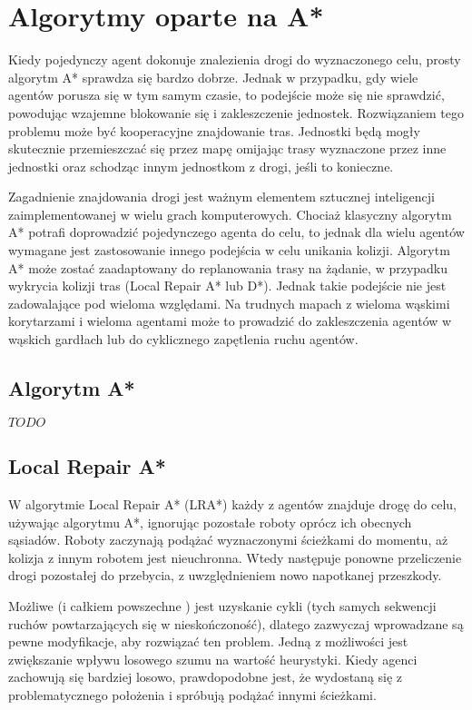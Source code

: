 \chapter{Algorytmy oparte na A*}
\label{ch:astar}

Kiedy pojedynczy agent dokonuje znalezienia drogi do wyznaczonego celu, prosty algorytm A* sprawdza się bardzo dobrze. Jednak w przypadku, gdy wiele agentów porusza się w tym samym czasie, to podejście może się nie sprawdzić, powodując wzajemne blokowanie się i zakleszczenie jednostek. Rozwiązaniem tego problemu może być kooperacyjne znajdowanie tras. Jednostki będą mogły skutecznie przemieszczać się przez mapę omijając trasy wyznaczone przez inne jednostki oraz schodząc innym jednostkom z drogi, jeśli to konieczne. \cite{cooppath}

Zagadnienie znajdowania drogi jest ważnym elementem sztucznej inteligencji zaimplementowanej w wielu grach komputerowych. Chociaż klasyczny algorytm A* potrafi doprowadzić pojedynczego agenta do celu, to jednak dla wielu agentów wymagane jest zastosowanie innego podejścia w celu unikania kolizji. Algorytm A* może zostać zaadaptowany do replanowania trasy na żądanie, w przypadku wykrycia kolizji tras (Local Repair A* lub D*). Jednak takie podejście nie jest zadowalające pod wieloma względami. Na trudnych mapach z wieloma wąskimi korytarzami i wieloma agentami może to prowadzić do zakleszczenia agentów w wąskich gardłach lub do cyklicznego zapętlenia ruchu agentów. \cite{cooppath}

\section{Algorytm A*}
$TODO$

\section{Local Repair A*}
W algorytmie Local Repair A* (LRA*) każdy z agentów znajduje drogę do celu, używając algorytmu A*, ignorując pozostałe roboty oprócz ich obecnych sąsiadów. Roboty zaczynają podążać wyznaczonymi ścieżkami do momentu, aż kolizja z innym robotem jest nieuchronna. Wtedy następuje ponowne przeliczenie drogi pozostałej do przebycia, z uwzględnieniem nowo napotkanej przeszkody.

Możliwe (i całkiem powszechne \cite{cooppath}) jest uzyskanie cykli (tych samych sekwencji ruchów powtarzających się w nieskończoność), dlatego zazwyczaj wprowadzane są pewne modyfikacje, aby rozwiązać ten problem. Jedną z możliwości jest zwiększanie wpływu losowego szumu na wartość heurystyki. Kiedy agenci zachowują się bardziej losowo, prawdopodobne jest, że wydostaną się z problematycznego położenia i spróbują podążać innymi ścieżkami.

